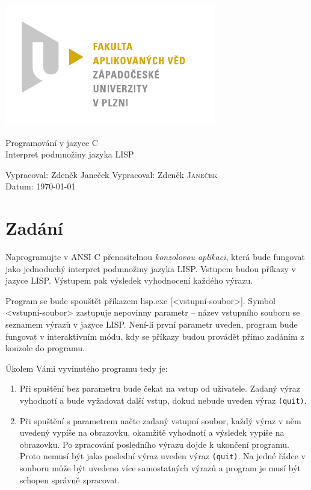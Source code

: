 \documentclass[a4paper, 12pt]{article}
\begin{document}
\begin{titlepage}
\includegraphics[bb=0 0 167 96]{fav_cmyk.pdf}
\vfill
\begin{center}
{\huge Programování v jazyce C}\\[3ex]
{\Large Interpret podmnožiny jazyka LISP}
\end{center}
\vfill
\begin{tabbing}
Vypracoval: \hspace{1ex}\=Zdeněk Janeček\kill
Vypracoval: \>Zdeněk \textsc{Janeček}\\[1ex]
Datum:\> \today
\end{tabbing}
\end{titlepage}

\tableofcontents

\section{Zadání}
Naprogramujte v ANSI C přenositelnou \emph{konzolovou aplikaci}, která
bude fungovat jako jednoduchý interpret podmnožiny jazyka LISP.
Vstupem budou příkazy v jazyce LISP. Výstupem pak výsledek vyhodnocení
každého výrazu.

Program se bude spouštět příkazem \textsf{lisp.exe
  [\textless{}vstupní-soubor\textgreater{}]}. Symbol
\textsf{\textless{}vstupní-soubor\textgreater{}} zastupuje nepovinny
parametr -- název vstupního souboru se seznamem výrazů v jazyce
LISP. Není-li první parametr uveden, program bude fungovat v
interaktivním módu, kdy se příkazy budou provádět přímo zadáním z
konzole do programu.

Úkolem Vámi vyvinutého programu tedy je:
\begin{enumerate}
\item Při spuštění bez parametru bude čekat na vstup od uživatele.
  Zadaný výraz vyhodnotí a bude vyžadovat další vstup, dokud nebude
  uveden výraz \texttt{(quit)}.
\item Při spuštění s parametrem načte zadaný vstupní soubor, každý
  výraz v něm uvedený vypíše na obrazovku, okamžitě vyhodnotí a
  výsledek vypíše na obrazovku. Po zpracování posledního výrazu dojde
  k ukončení programu. Proto nemusí být jako poslední výraz uveden
  výraz \texttt{(quit)}. Na jedné řádce v souboru může být uvedeno
  více samostatných výrazů a program je musí být schopen správně
  zpracovat.
\end{enumerate}
\end{document}
